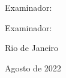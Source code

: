 Examinador:
      \vspace{0.5cm}
      \begin{flushright}
         \parbox{10cm}{
            \hrulefill

            \vspace{-.375cm}

            \vspace{0.1cm}
         }
      \end{flushright}

Examinador:
      \vspace{0.5cm}
      \begin{flushright}
         \parbox{10cm}{
            \hrulefill

            \vspace{-.375cm}

            \vspace{0.1cm}
         }
      \end{flushright}


      \vfill


\begin{center}
Rio de Janeiro

Agosto de 2022
\end{center}
